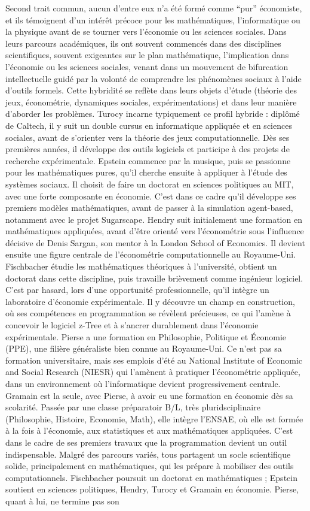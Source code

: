 Second trait commun, aucun d’entre eux n’a été formé comme “pur” économiste, et ils témoignent d'un intérêt précoce pour les mathématiques, l'informatique ou la physique avant de se tourner vers l'économie ou les sciences sociales. Dans leurs parcours académiques, ils ont souvent commencés dans des disciplines scientifiques, souvent exigeantes sur le plan mathématique, l’implication dans l’économie ou les sciences sociales, venant dans un mouvement de bifurcation intellectuelle guidé par la volonté de comprendre les phénomènes sociaux à l’aide d’outils formels. Cette hybridité se reflète dans leurs objets d’étude (théorie des jeux, économétrie, dynamiques sociales, expérimentations) et dans leur manière d’aborder les problèmes. Turocy incarne typiquement ce profil hybride : diplômé de Caltech, il y suit un double cursus en informatique appliquée et en sciences sociales, avant de s’orienter vers la théorie des jeux computationnelle. Dès ses premières années, il développe des outils logiciels et participe à des projets de recherche expérimentale. Epstein commence par la musique, puis se passionne pour les mathématiques pures, qu’il cherche ensuite à appliquer à l’étude des systèmes sociaux. Il choisit de faire un doctorat en sciences politiques au MIT, avec une forte composante en économie. C’est dans ce cadre qu’il développe ses premiers modèles mathématiques, avant de passer à la simulation agent-based, notamment avec le projet Sugarscape. Hendry suit initialement une formation en mathématiques appliquées, avant d’être orienté vers l’économétrie sous l’influence décisive de Denis Sargan, son mentor à la London School of Economics. Il devient ensuite une figure centrale de l’économétrie computationnelle au Royaume-Uni. Fischbacher étudie les mathématiques théoriques à l’université, obtient un doctorat dans cette discipline, puis travaille brièvement comme ingénieur logiciel. C’est par hasard, lors d’une opportunité professionnelle, qu’il intègre un laboratoire d’économie expérimentale. Il y découvre un champ en construction, où ses compétences en programmation se révèlent précieuses, ce qui l’amène à concevoir le logiciel z-Tree et à s’ancrer durablement dans l’économie expérimentale. Pierse a une formation en Philosophie, Politique et Économie (PPE), une filière généraliste bien connue au Royaume-Uni. Ce n’est pas sa formation universitaire, mais ses emplois d’été au National Institute of Economic and Social Research (NIESR) qui l’amènent à pratiquer l’économétrie appliquée, dans un environnement où l’informatique devient progressivement centrale. Gramain est la seule, avec Pierse, à avoir eu une formation en économie dès sa scolarité. Passée par une classe préparatoir B/L, très pluridsciplinaire (Philosophie, Histoire, Economie, Math), elle intègre l’ENSAE, où elle est formée à la fois à l’économie, aux statistiques et aux mathématiques appliquées. C’est dans le cadre de ses premiers travaux que la programmation devient un outil indispensable. Malgré des parcours variés, tous partagent un socle scientifique solide, principalement en mathématiques, qui les prépare à mobiliser des outils computationnels. Fischbacher poursuit un doctorat en mathématiques ; Epstein soutient en sciences politiques, Hendry, Turocy et Gramain en économie. Pierse, quant à lui, ne termine pas son 